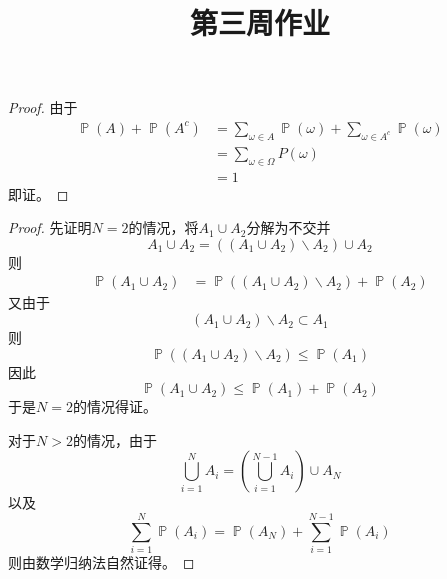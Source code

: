 \documentclass[cn]{homework}
\title{第三周作业}
\DeclareMathOperator{\prob}{\mathbb P}
\begin{document}
    \maketitle

    \problem
    \begin{subproblem}
        \item
        \begin{proof}
            由于
            \begin{align*}
                \prob(A)+\prob(A^c)&=
                \sum_{\omega\in A}\prob(\omega)+\sum_{\omega\in A^c}\prob(\omega)\\
                &=\sum_{\omega\in\Omega}P(\omega)\\
                &=1
            \end{align*}
            即证。
        \end{proof}

        \item
        \begin{proof}
            先证明$N=2$的情况，将$A_1\cup A_2$分解为不交并
            \[A_1\cup A_2=((A_1\cup A_2)\backslash A_2)\cup A_2\]
            则
            \begin{align*}
                \prob(A_1\cup A_2)&=\prob((A_1\cup A_2)\backslash A_2)
                +\prob(A_2)
            \end{align*}
            又由于
            \[(A_1\cup A_2)\backslash A_2\subset A_1\]
            则
            \[\prob((A_1\cup A_2)\backslash A_2)\leq\prob(A_1)\]
            因此
            \[\prob(A_1\cup A_2)\leq\prob(A_1)+\prob(A_2)\]
            于是$N=2$的情况得证。

            对于$N>2$的情况，由于
            \[\bigcup_{i=1}^NA_i=\left(\bigcup_{i=1}^{N-1}A_i\right)\cup A_N\]
            以及
            \[\sum_{i=1}^N\prob(A_i)=\prob(A_N)+\sum_{i=1}^{N-1}\prob(A_i)\]
            则由数学归纳法自然证得。
        \end{proof}
    \end{subproblem}
\end{document}
